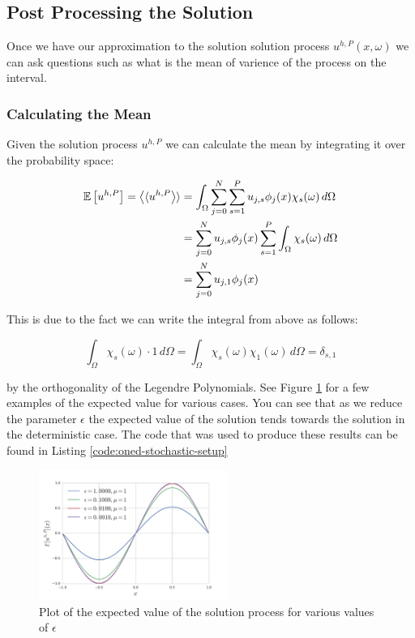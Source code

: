\subsection{Post Processing the Solution}

Once we have our approximation to the solution solution process
$u^{h,P}(x,\omega)$ we can ask questions such as what is the mean of varience
of the process on the interval.

\subsubsection{Calculating the Mean}

Given the solution process $u^{h,P}$ we can calculate the mean by integrating it
over the probability space:

\begin{align}
  \begin{split}
    \mathbb{E}\left[u^{h,P}\right] = \left\langle\langle u^{h,P}\right\rangle\rangle &=
    \int_\Omega\sum_{j=0}^N\sum_{s=1}^Pu_{j,s}\phi_j(x)\chi_s(\omega)\, d\Omega \\
    &= \sum_{j=0}^Nu_{j,s}\phi_j(x)\sum_{s=1}^P\int_\Omega\chi_s(\omega)\, d\Omega \\
    &= \sum_{j=0}^Nu_{j,1}\phi_j(x)
  \end{split}
\end{align}

This is due to the fact we can write the integral from above as follows:

\begin{equation}
    \int_\Omega\chi_s(\omega)\cdot 1\, d\Omega =
    \int_\Omega\chi_s(\omega)\chi_1(\omega)\, d\Omega = \delta_{s,1}
\end{equation}

by the orthogonality of the Legendre Polynomials. See Figure
\ref{fig:oned-stochastic-expected-value-plots} for a few examples of the
expected value for various cases. You can see that as we reduce the parameter
$\epsilon$ the expected value of the solution tends towards the solution in the
deterministic case. The code that was used to produce these results can be
found in Listing \ref{code:oned-stochastic-setup}

\begin{figure}
    \centering
    \includegraphics[width=0.55\textwidth]{img/oned-stochastic-mean-soln-process.pdf}
    \caption{Plot of the expected value of the solution process for various
    values of $\epsilon$}
    \label{fig:oned-stochastic-expected-value-plots}
\end{figure}

